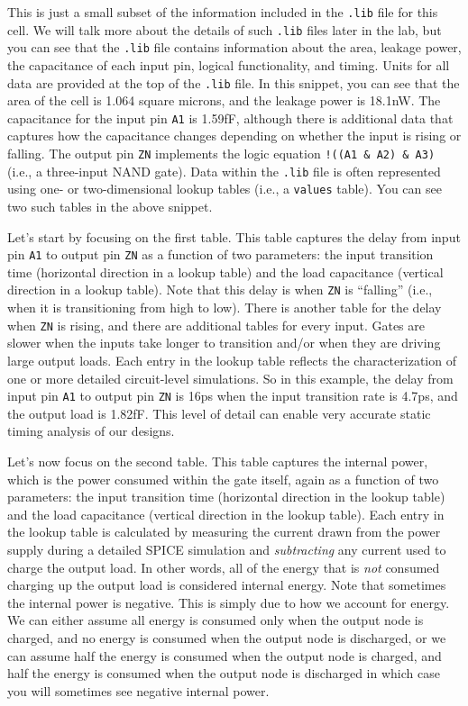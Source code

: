 \documentclass[a4paper,12pt,twoside]{article}
\begin{document}
This is just a small subset of the information included in the \texttt{.lib} file for this cell. We will talk more about the details of such \texttt{.lib} files later in the lab, but you can see that the \texttt{.lib} file contains information about the area, leakage power, the capacitance of each input pin, logical functionality, and timing. Units for all data are provided at the top of the \texttt{.lib} file. In this snippet, you can see that the area of the cell is 1.064 square microns, and the leakage power is 18.1nW. The capacitance for the input pin \texttt{A1} is 1.59fF, although there is additional data that captures how the capacitance changes depending on whether the input is rising or falling. The output pin \texttt{ZN} implements the logic equation \verb|!((A1 & A2) & A3)| (i.e., a three-input NAND gate). Data within the \texttt{.lib} file is often represented using one- or two-dimensional lookup tables (i.e., a \texttt{values} table). You can see two such tables in the above snippet.

Let’s start by focusing on the first table. This table captures the delay from input pin \texttt{A1} to output pin \texttt{ZN} as a function of two parameters: the input transition time (horizontal direction in a lookup table) and the load capacitance (vertical direction in a lookup table). Note that this delay is when \texttt{ZN} is “falling” (i.e., when it is transitioning from high to low). There is another table for the delay when \texttt{ZN} is rising, and there are additional tables for every input. Gates are slower when the inputs take longer to transition and/or when they are driving large output loads. Each entry in the lookup table reflects the characterization of one or more detailed circuit-level simulations. So in this example, the delay from input pin \texttt{A1} to output pin \texttt{ZN} is 16ps when the input transition rate is 4.7ps, and the output load is 1.82fF. This level of detail can enable very accurate static timing analysis of our designs.

Let’s now focus on the second table. This table captures the internal power, which is the power consumed within the gate itself, again as a function of two parameters: the input transition time (horizontal direction in the lookup table) and the load capacitance (vertical direction in the lookup table). Each entry in the lookup table is calculated by measuring the current drawn from the power supply during a detailed SPICE simulation and \textit{subtracting} any current used to charge the output load. In other words, all of the energy that is \textit{not} consumed charging up the output load is considered internal energy. Note that sometimes the internal power is negative. This is simply due to how we account for energy. We can either assume all energy is consumed only when the output node is charged, and no energy is consumed when the output node is discharged, or we can assume half the energy is consumed when the output node is charged, and half the energy is consumed when the output node is discharged in which case you will sometimes see negative internal power.
\end{document}
